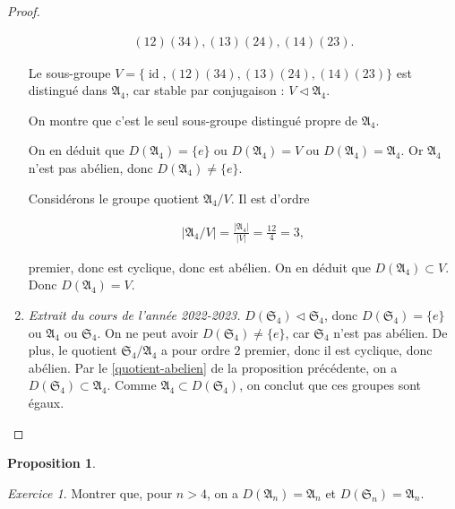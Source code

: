 \documentclass[french]{book}
\theoremstyle{definition}
\newtheorem{protoproposition}{Proposition}[section]
\newenvironment{prop}
    {\colorlet{shadecolor}{blue!5}\begin{shaded}\begin{protoproposition}}
    {\end{protoproposition}\end{shaded}}
\theoremstyle{remark}
\newtheorem{exo}{Exercice}
\newcommand{\biggg}{>}
\newcommand{\bg}{\biggg}
\begin{document}
\begin{proof}
\begin{enumerate}
    \begin{gather*}
      (1 2)(3 4), (1 3)(2 4), (1 4) (2 3).
    \end{gather*}

    Le sous-groupe \(V = \{ \operatorname{id},  (1 2)(3 4), (1 3)(2 4), (1 4) (2 3)\}\) est distingué dans \(\mathfrak{A}_4\), car stable par conjugaison : \(V \triangleleft \mathfrak{A}_4\).

    On montre que c'est le seul sous-groupe distingué propre de \(\mathfrak{A}_4\).

    On en déduit que \(D(\mathfrak{A}_4) = \{ e \}\) ou \(D(\mathfrak{A}_4) = V\) ou \(D(\mathfrak{A}_4) = \mathfrak{A}_4\). Or \(\mathfrak{A}_4\) n'est pas abélien, donc \(D(\mathfrak{A}_4) \neq \{ e \}\).

    Considérons le groupe quotient \(\mathfrak{A}_4 / V\). Il est d'ordre

    \begin{gather*}
      \left\lvert \mathfrak{A}_4/V \right\rvert = \frac{\left\lvert \mathfrak{A}_4 \right\rvert}{\left\lvert V \right\rvert} = \frac{12}{4}= 3,
    \end{gather*}

    premier, donc est cyclique, donc est abélien. On en déduit que \(D(\mathfrak{A}_4) \subset V\). Donc \(D(\mathfrak{A}_4) = V\).

    \item \emph{Extrait du cours de l'année 2022-2023.} \(D(\mathfrak{S}_{4}) \triangleleft \mathfrak{S}_{4}\), donc \(D(\mathfrak{S}_{4}) = \{ e \}\) ou \(\mathfrak{A}_{4}\) ou \(\mathfrak{S}_{4}\). On ne peut avoir \(D(\mathfrak{S}_{4}) \neq \{ e \}\), car \(\mathfrak{S}_{4}\) n'est pas abélien.
    De plus, le quotient \(\mathfrak{S}_{4}/\mathfrak{A}_{4}\) a pour ordre \(2\) premier, donc il est cyclique, donc abélien. Par le \ref{quotient-abelien} de la proposition précédente, on a \(D(\mathfrak{S}_{4}) \subset \mathfrak{A}_{4}\). Comme \(\mathfrak{A}_{4} \subset D(\mathfrak{S}_{4})\), on conclut que ces groupes sont égaux.
  \end{enumerate}
\end{proof}

\begin{prop}
  \begin{exo}
    Montrer que, pour \(n \bg 4\), on a \(D(\mathfrak{A}_n) = \mathfrak{A}_n\) et \(D(\mathfrak{S}_n) = \mathfrak{A}_n\).
  \end{exo}
\end{prop}
\end{document}

